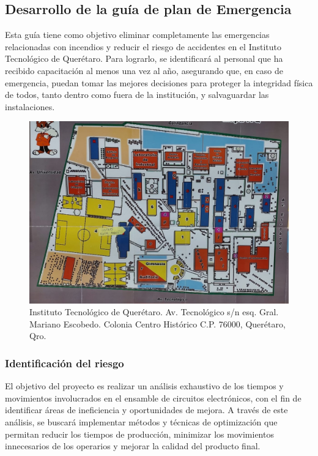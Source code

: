 \subsection{Desarrollo de la guía de plan de Emergencia}

Esta guía tiene como objetivo eliminar completamente las emergencias relacionadas con incendios y reducir el riesgo de accidentes en el Instituto Tecnológico de Querétaro. Para lograrlo, se identificará al personal que ha recibido capacitación al menos una vez al año, asegurando que, en caso de emergencia, puedan tomar las mejores decisiones para proteger la integridad física de todos, tanto dentro como fuera de la institución, y salvaguardar las instalaciones.
%
%
\begin{figure}[H]
        \centering
        \includegraphics[trim = {0mm 0mm 0mm 0mm},clip,scale=0.2]{10/Img/mapa.jpg}
        \caption{Instituto Tecnológico de Querétaro. Av. Tecnológico s/n esq. Gral. Mariano Escobedo. Colonia Centro Histórico C.P. 76000, Querétaro, Qro.}
        \label{Mapa}
    \end{figure}
%
%
\subsubsection{Identificación del riesgo}

El objetivo del proyecto es realizar un análisis exhaustivo de los tiempos y movimientos involucrados en el ensamble de circuitos electrónicos, con el fin de identificar áreas de ineficiencia y oportunidades de mejora. A través de este análisis, se buscará implementar métodos y técnicas de optimización que permitan reducir los tiempos de producción, minimizar los movimientos innecesarios de los operarios y mejorar la calidad del producto final.
%
%

